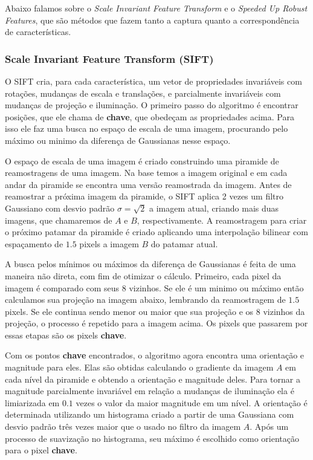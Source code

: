   Abaixo falamos sobre o \textit{Scale Invariant Feature Transform} e o \textit{Speeded Up Robust Features}, que são
métodos que fazem tanto a captura quanto a correspondência de características.

\subsubsection{Scale Invariant Feature Transform (SIFT)}
  O SIFT cria, para cada característica, um vetor de propriedades invariáveis com rotações, mudanças de escala e 
translações, e parcialmente invariáveis com mudanças de projeção e iluminação. O primeiro passo do algoritmo é encontrar
posições, que ele chama de \textbf{chave}, que obedeçam as propriedades acima. Para isso ele faz uma busca no espaço
de escala de uma imagem, procurando pelo máximo ou minimo da diferença de Gaussianas nesse espaço.

  O espaço de escala de uma imagem é criado construindo uma piramide de reamostragens de uma imagem. Na base temos a 
imagem original e em cada andar da piramide se encontra uma versão reamostrada da imagem. Antes de reamostrar a próxima 
imagem da piramide, o SIFT aplica 2 vezes um filtro Gaussiano com desvio padrão $\sigma = \sqrt{2}$ a imagem atual, 
criando mais duas imagens, que chamaremos de $A$ e $B$, respectivamente. A reamostragem para criar o próximo patamar da 
piramide é criado aplicando uma interpolação bilinear com espaçamento de $1.5$ pixels a imagem $B$ do patamar atual.
 
  A busca pelos mínimos ou máximos da diferença de Gaussianas é feita de uma maneira não direta, com fim de otimizar
o cálculo. Primeiro, cada pixel da imagem é comparado com seus 8 vizinhos. Se ele é um minimo ou máximo então calculamos
sua projeção na imagem abaixo, lembrando da reamostragem de $1.5$ pixels. Se ele continua sendo menor ou maior que sua 
projeção e os 8 vizinhos da projeção, o processo é repetido para a imagem acima. Os pixels que passarem por essas 
etapas são os pixels \textbf{chave}.

  Com os pontos \textbf{chave} encontrados, o algoritmo agora encontra uma orientação e magnitude para eles. Elas são
obtidas calculando o gradiente da imagem $A$ em cada nível da piramide e obtendo a orientação e magnitude deles. Para
tornar a magnitude parcialmente invariável em relação a mudanças de iluminação ela é limiarizada em $0.1$ vezes o valor
da maior magnitude em um nível. A orientação é determinada utilizando um histograma criado a partir de uma Gaussiana
com desvio padrão três vezes maior que o usado no filtro da imagem $A$. Após um processo de suavização no histograma,
seu máximo é escolhido como orientação para o pixel \textbf{chave}. 

